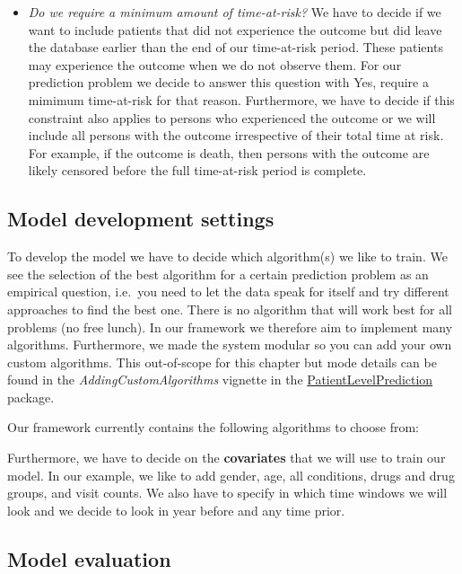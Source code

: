 \documentclass[11pt]{book}
\theoremstyle{definition}
\theoremstyle{definition}
\theoremstyle{definition}
\theoremstyle{remark}
\begin{document}
\begin{itemize}
\item
  \emph{Do we require a minimum amount of time-at-risk?} We have to decide if we want to include patients that did not experience the outcome but did leave the database earlier than the end of our time-at-risk period. These patients may experience the outcome when we do not observe them. For our prediction problem we decide to answer this question with Yes, require a mimimum time-at-risk for that reason. Furthermore, we have to decide if this constraint also applies to persons who experienced the outcome or we will include all persons with the outcome irrespective of their total time at risk. For example, if the outcome is death, then persons with the outcome are likely censored before the full time-at-risk period is complete.
\end{itemize}

\hypertarget{model-development-settings}{%
\subsection{Model development settings}\label{model-development-settings}}

To develop the model we have to decide which algorithm(s) we like to train. We see the selection of the best algorithm for a certain prediction problem as an empirical question, i.e.~you need to let the data speak for itself and try different approaches to find the best one. There is no algorithm that will work best for all problems (no free lunch). In our framework we therefore aim to implement many algorithms. Furthermore, we made the system modular so you can add your own custom algorithms. This out-of-scope for this chapter but mode details can be found in the \emph{AddingCustomAlgorithms} vignette in the \href{https://ohdsi.github.io/PatientLevelPrediction/}{PatientLevelPrediction} package.

Our framework currently contains the following algorithms to choose from:

Furthermore, we have to decide on the \textbf{covariates} that we will use to train our model. In our example, we like to add gender, age, all conditions, drugs and drug groups, and visit counts. We also have to specify in which time windows we will look and we decide to look in year before and any time prior.

\hypertarget{model-evaluation}{%
\subsection{Model evaluation}\label{model-evaluation}}
\end{document}
